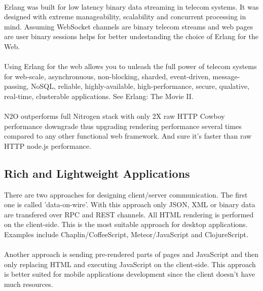 
\paragraph{}
Erlang was built for low latency binary data streaming in telecom systems.
It was designed with extreme manageability, scalability
and concurrent processing in mind. Assuming WebSocket channels are binary
telecom streams and web pages are user binary sessions
helps for better undestanding the choice of Erlang for the Web.

\paragraph{}
Using Erlang for the web allows you to unleash the full power of telecom systems for
web-scale, asynchronuous, non-blocking, sharded, event-driven,
message-passing, NoSQL, reliable, highly-available, high-performance,
secure, qualative, real-time, clusterable applications. See Erlang: The Movie II.

\paragraph{}
N2O outperforms full Nitrogen stack with only 2X raw HTTP Cowboy
performance downgrade thus upgrading rendering performance several
times compared to any other functional web framework. And
sure it's faster than raw HTTP node.js performance.

\subsection{Rich and Lightweight Applications}
There are two approaches for designing client/server communication.
The first one is called 'data-on-wire'. With this approach only JSON, XML or binary
data are transfered over RPC and REST channels. All HTML rendering
is performed on the client-side. This is the most suitable approach for desktop
applications. Examples include Chaplin/CoffeeScript, Meteor/JavaScript
and ClojureScript.

\paragraph{}
Another approach is sending pre-rendered parts of pages and JavaScript
and then only replacing HTML and executing JavaScript on the client-side. This approach
is better suited for mobile applications development since the client doesn't have much resources.


